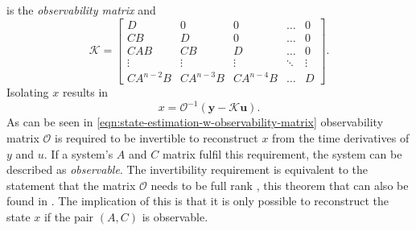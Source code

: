 is the \textit{observability matrix} and
\[ \mathcal{K}=
\begin{bmatrix}
    D & 0 & 0 & \hdots & 0\\
    CB & D & 0 & \hdots & 0\\
    CAB & CB & D & \hdots & 0 \\
    \vdots & \vdots & \vdots & \ddots & \vdots \\
    CA^{n-2}B & CA^{n-3}B & CA^{n-4}B & \hdots & D
\end{bmatrix}.
\]
Isolating $x$ results in
\begin{equation}\label{eqn:state-estimation-w-observability-matrix}
    x = \mathcal{O}^{-1}(\mathbf{y}-\mathcal{K}\mathbf{u}).
\end{equation}
As can be seen in \eqref{eqn:state-estimation-w-observability-matrix} observability matrix $\mathcal{O}$ is required to be invertible to reconstruct $x$ from the time derivatives of $y$ and $u$. If a system's $A$ and $C$ matrix fulfil this requirement, the system can be described as \textit{observable}. The invertibility requirement is equivalent to the statement that the matrix $\mathcal{O}$ needs to be full rank \cite[Section 2.9]{Lay2016LinearApplications}, this theorem that can also be found in \cite[Corollary 3.8]{Antsaklis2006LinearSystems}. The implication of this is that it is only possible to reconstruct the state $x$ if the pair $(A,C)$ is observable. 

